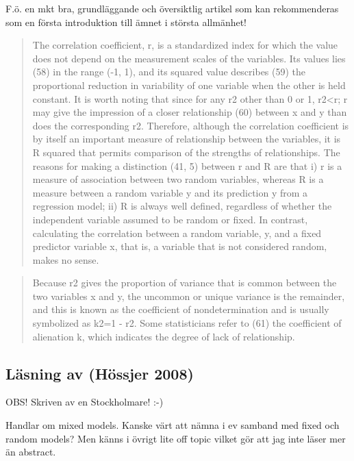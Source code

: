 \documentclass[]{article}
\begin{document}
F.ö. en mkt bra, grundläggande och översiktlig artikel som kan
rekommenderas som en första introduktion till ämnet i största allmänhet!

\begin{quote}
The correlation coefficient, r, is a standardized index for which the
value does not depend on the measurement scales of the variables. Its
values lies (58) in the range (-1, 1), and its squared value describes
(59) the proportional reduction in variability of one variable when the
other is held constant. It is worth noting that since for any r2 other
than 0 or 1, \textbar{}r2\textbar{}\textless{}r; r may give the
impression of a closer relationship (60) between x and y than does the
corresponding r2. Therefore, although the correlation coefficient is by
itself an important measure of relationship between the variables, it is
R squared that permits comparison of the strengths of relationships. The
reasons for making a distinction (41, 5) between r and R are that i) r
is a measure of association between two random variables, whereas R is a
measure between a random variable y and its prediction y from a
regression model; ii) R is always well defined, regardless of whether
the independent variable assumed to be random or fixed. In contrast,
calculating the correlation between a random variable, y, and a fixed
predictor variable x, that is, a variable that is not considered random,
makes no sense.
\end{quote}

\begin{quote}
Because r2 gives the proportion of variance that is common between the
two variables x and y, the uncommon or unique variance is the remainder,
and this is known as the coefficient of nondetermination and is usually
symbolized as k2=1 - r2. Some statisticians refer to (61) the
coefficient of alienation k, which indicates the degree of lack of
relationship.
\end{quote}

\subsection{Läsning av (Hössjer 2008)}\label{lasning-av-hossjer2008}

OBS! Skriven av en Stockholmare! :-)

Handlar om mixed models. Kanske värt att nämna i ev samband med fixed
och random models? Men känns i övrigt lite off topic vilket gör att jag
inte läser mer än abstract.
\end{document}
